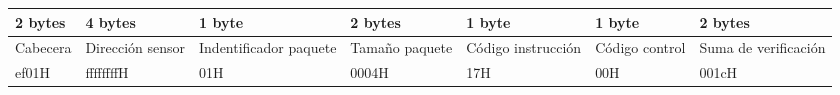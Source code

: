 \small
\begin{tabular}{|C{1.6cm}|C{1.6cm}|C{2.1cm}|C{1.6cm}|C{1.6cm}|C{1.6cm}|C{2.1cm}|}
   bytes & 4 bytes & 1 byte & 2 bytes & 1 byte & 1 byte & 2 bytes \\
  \hline
  Cabecera & Dirección sensor & Indentificador paquete & Tamaño paquete & Código instrucción & Código control & Suma de verificación \\
  \hline
  ef01H & ffffffffH & 01H & 0004H & 17H & 00H & 001cH \\
  \hline
\end{tabular}